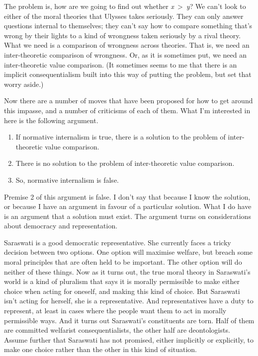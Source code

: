 \documentclass[
  10pt,
  letterpaper,
  twoside]{scrbook}
\providecommand{\tightlist}{%
  \setlength{\itemsep}{0pt}\setlength{\parskip}{0pt}}\usepackage{longtable,booktabs,array}
\begin{document}
The problem is, how are we going to find out whether
\emph{x}~\textgreater~\emph{y}? We can't look to either of the moral
theories that {Ulysses} takes seriously. They can only answer questions
internal to themselves; they can't say how to compare something that's
wrong by their lights to a kind of wrongness taken seriously by a rival
theory. What we need is a comparison of wrongness across theories. That
is, we need an inter-theoretic comparison of wrongness. Or, as it is
sometimes put, we need an inter-theoretic value comparison. (It
sometimes seems to me that there is an implicit consequentialism built
into this way of putting the problem, but set that worry aside.)

Now there are a number of moves that have been proposed for how to get
around this impasse, and a number of criticisms of each of them. What
I'm interested in here is the following argument.

\begin{enumerate}
\def\labelenumi{\arabic{enumi}.}
\tightlist
\item
  If normative internalism is true, there is a solution to the problem
  of inter-theoretic value comparison.
\item
  There is no solution to the problem of inter-theoretic value
  comparison.
\item
  So, normative internalism is false.
\end{enumerate}

Premise 2 of this argument is false. I don't say that because I know the
solution, or because I have an argument in favour of a particular
solution. What I do have is an argument that a solution must exist. The
argument turns on considerations about democracy and representation.

{Saraswati} is a good democratic representative. She currently faces a
tricky decision between two options. One option will maximise welfare,
but breach some moral principles that are often held to be important.
The other option will do neither of these things. Now as it turns out,
the true moral theory in {Saraswati}'s world is a kind of pluralism that
says it is morally permissible to make either choice when acting for
oneself, and making this kind of choice. But {Saraswati} isn't acting
for herself, she is a representative. And representatives have a duty to
represent, at least in cases where the people want them to act in
morally permissible ways. And it turns out {Saraswati}'s constituents
are torn. Half of them are committed welfarist consequentialists, the
other half are deontologists. Assume further that {Saraswati} has not
promised, either implicitly or explicitly, to make one choice rather
than the other in this kind of situation.
\end{document}
